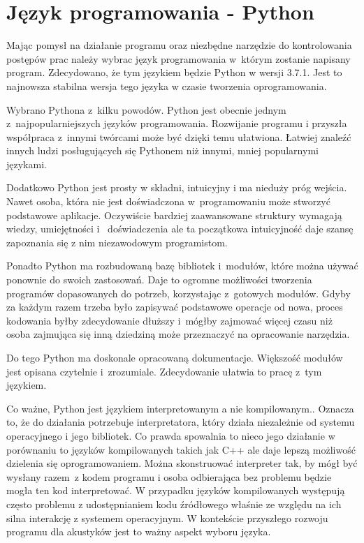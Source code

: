 \documentclass[eng,printmode]{mgr}
\begin{document}
\section{Język programowania - Python}
Mając pomysł na działanie programu oraz niezbędne narzędzie do kontrolowania postępów prac należy wybrac język programowania w~którym zostanie napisany program. Zdecydowano, że tym językiem będzie Python w wersji 3.7.1. Jest to najnowsza stabilna wersja tego języka\cite{Python_latest_release} w czasie tworzenia oprogramowania.

Wybrano Pythona z~kilku powodów. Python jest obecnie jednym z~najpopularniejszych języków programowania\cite{Python_popular}. Rozwijanie programu i przyszła współpraca z~innymi twórcami może być dzięki temu ułatwiona. Łatwiej znaleźć innych ludzi posługujących się Pythonem niż innymi, mniej popularnymi językami. 

Dodatkowo Python jest prosty w składni, intuicyjny i ma nieduży próg wejścia. Nawet osoba, która nie jest doświadczona w~programowaniu może stworzyć podstawowe aplikacje. Oczywiście bardziej zaawansowane struktury wymagają wiedzy, umiejętności i~ doświadczenia ale ta początkowa intuicyjność daje szansę zapoznania się z nim niezawodowym programistom.

Ponadto Python ma rozbudowaną bazę bibliotek i~modułów, które można używać ponownie do swoich zastosowań.\cite{Pypie} Daje to ogromne możliwości tworzenia programów dopasowanych do potrzeb, korzystając z~gotowych modułów. Gdyby za każdym razem trzeba było zapisywać podstawowe operacje od nowa, proces kodowania byłby zdecydowanie dłuższy i~mógłby zajmować więcej czasu niż osoba zajmująca się inną dziedziną może przeznaczyć na opracowanie narzędzia. 

Do tego Python ma doskonale opracowaną dokumentacje. Większość modułów jest opisana czytelnie i~zrozumiale. Zdecydowanie ułatwia to pracę z~tym językiem. 

Co ważne, Python jest językiem interpretowanym a nie kompilowanym.\cite{Przewodnik_po_pythonie}. Oznacza to, że do działania potrzebuje interpretatora, który działa niezależnie od systemu operacyjnego i jego bibliotek. Co prawda spowalnia to nieco jego działanie w porównaniu to języków kompilowanych takich jak C++ ale daje lepszą możliwość dzielenia się oprogramowaniem. Można skonstruować interpreter tak, by mógł być wysłany razem~z kodem programu i osoba odbierająca bez problemu będzie mogła ten kod interpretować. W przypadku języków kompilowanych występują często problemu  z udostępnianiem kodu źródłowego właśnie ze względu na ich silna interakcję z systemem operacyjnym. W kontekście przyszłego rozwoju programu dla akustyków jest to ważny aspekt wyboru języka.
\end{document}
